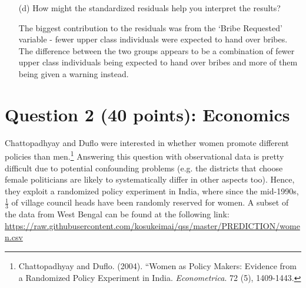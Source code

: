 \documentclass[12pt,letterpaper]{article}
\begin{document}
\begin{enumerate}
	
	
	\item [(d)] How might the standardized residuals help you interpret the results?  

    The biggest contribution to the residuals was from the `Bribe Requested' variable - 
    fewer upper class individuals were expected to hand over bribes.  The difference 
    between the two groups appears to be a combination of fewer upper class individuals
    being expected to hand over bribes and more of them being given a warning instead.
    
  
\end{enumerate}


\newpage

\section*{Question 2 (40 points): Economics}
Chattopadhyay and Duflo were interested in whether women promote different policies than men.\footnote{Chattopadhyay and Duflo. (2004). ``Women as Policy Makers: Evidence from a Randomized Policy Experiment in India. \textit{Econometrica}. 72 (5), 1409-1443.} Answering this question with observational data is pretty difficult due to potential confounding problems (e.g. the districts that choose female politicians are likely to systematically differ in other aspects too). Hence, they exploit a randomized policy experiment in India, where since the mid-1990s, $\frac{1}{3}$ of village council heads have been randomly reserved for women. A subset of the data from West Bengal can be found at the following link: \url{https://raw.githubusercontent.com/kosukeimai/qss/master/PREDICTION/women.csv}\\
\end{document}
